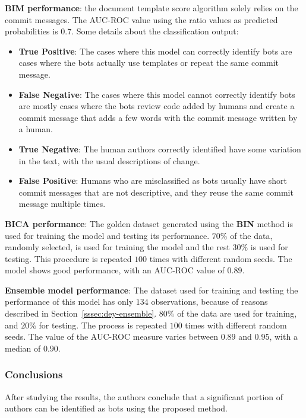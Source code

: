 \documentclass[a4paper, 12pt]{book}
\begin{document}
\textbf{BIM performance}: the document template score algorithm solely relies on the commit messages. The AUC-ROC value using the ratio values as predicted probabilities is $0.7$. Some details about the classification output:
\begin{itemize}
	\item \textbf{True Positive}: The cases where this model can correctly identify
bots are cases where the bots actually use templates or repeat the same commit message. 
    \item \textbf{False Negative}: The cases where this model cannot correctly identify bots are mostly cases where the bots review code added by humans and create a commit message that adds a few words with the commit message written by a human.
    \item \textbf{True Negative}: The human authors correctly identified have some variation in the text, with the usual descriptions of change.
    \item \textbf{False Positive}: Humans who are misclassified as bots usually have short commit messages that are not descriptive, and they reuse the same commit message multiple times.
\end{itemize}

\textbf{BICA performance}: The golden dataset generated using the \textbf{BIN} method is used for training the model and testing its performance. $70\%$ of the data, randomly selected, is used for training the model and the rest $30\%$ is used for testing. This procedure is repeated $100$ times with different random seeds. The model shows good performance, with an AUC-ROC value of $0.89$.

\textbf{Ensemble model performance}: The dataset used for training and testing the performance of this model has only $134$ observations, because of reasons described in Section~\ref{sssec:dey-ensemble}. $80\%$ of the data are used for training, and $20\%$ for testing. The process is repeated $100$ times with different random seeds. The value of the AUC-ROC measure varies between $0.89$ and $0.95$, with a median of $0.90$.

\subsubsection{Conclusions}
\label{sssec:dey-conclusions}

After studying the results, the authors conclude that a significant portion of authors can be identified as bots using the proposed method.
\end{document}

